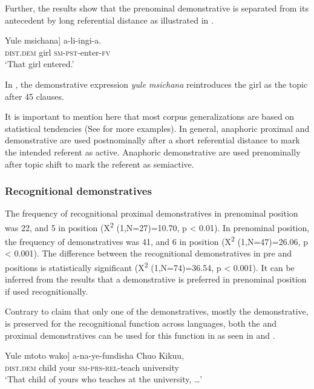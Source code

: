 \documentclass[output=paper,
modfonts
]{langscibook}
\begin{document}
Further, the results show that the  prenominal demonstrative is separated from its antecedent by long referential distance as illustrated in .

\ea\label{ex:mwamzandi:17}
\gll {\ob}Yule msichana] a-li-ingi-a.\\
     {\db}\textsc{dist}.\textsc{dem} girl \textsc{sm}{}-\textsc{pst}{}-enter-\textsc{fv}\\
\glt ‘That girl entered.’
\z

In , the demonstrative expression \textit{yule msichana} reintroduces the girl as the topic after 45 clauses.

It is important to mention here that most corpus generalizations are based on statistical tendencies (See \citealt{Mwamzandi2014} for more examples). In general, anaphoric proximal and  demonstrative are used postnominally after a short referential distance to mark the intended referent as active. Anaphoric  demonstrative are used prenominally after topic shift to mark the referent as semiactive.

\subsubsection{Recognitional demonstratives}\label{sec:mwamzandi:3.1.4}

The frequency of recognitional proximal demonstratives in prenominal position was 22, and 5 in  position (X\textsuperscript{2} (1,N=27)=10.70, p < 0.01). In prenominal position, the frequency of  demonstratives was 41, and 6 in  position (X\textsuperscript{2} (1,N=47)=26.06, p < 0.001). The difference between the recognitional demonstratives in pre and  positions is statistically significant (X\textsuperscript{2} (1,N=74)=36.54, p < 0.001). It can be inferred from the results that a demonstrative is preferred in prenominal position if used recognitionally.

Contrary to  claim that only one of the demonstratives, mostly the  demonstrative, is preserved for the recognitional function across languages, both the  and proximal demonstratives can be used for this function in  as seen in  and .

\ea\label{ex:mwamzandi:18}
\gll  {\ob}Yule mtoto wako] a-na-ye-fundisha {Chuo Kikuu},\\
     {\db}\textsc{dist}.\textsc{dem} child your \textsc{sm}{}-\textsc{prs}{}-\textsc{rel}{}-teach university\\
\glt ‘That child of yours who teaches at the university, {\dots}’
\z
\end{document}
